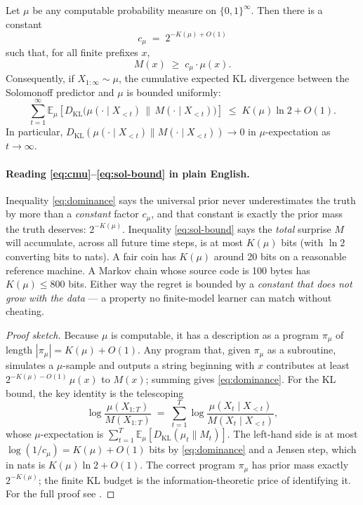 \begin{theorem}
\label{thm:solomonoff}
Let $\mu$ be any computable probability measure on $\{0,1\}^\infty$.
Then there is a constant
\begin{equation}
  c_\mu \;=\; 2^{-K(\mu) + O(1)}
  \label{eq:cmu}
\end{equation}
such that, for all finite prefixes $x$,
\begin{equation}
  M(x) \;\ge\; c_\mu \cdot \mu(x).
  \label{eq:dominance}
\end{equation}
Consequently, if $X_{1:\infty} \sim \mu$, the cumulative expected
KL divergence between the Solomonoff predictor and $\mu$ is bounded
uniformly:
\begin{equation}
  \sum_{t=1}^{\infty}
    \mathbb{E}_{\mu}\!\left[
      D_{\mathrm{KL}}\!\bigl(\mu(\cdot \mid X_{<t}) \,\|\, M(\cdot \mid X_{<t})\bigr)
    \right]
  \;\le\; K(\mu)\ln 2 + O(1).
  \label{eq:sol-bound}
\end{equation}
In particular,
$D_{\mathrm{KL}}(\mu(\cdot \mid X_{<t}) \| M(\cdot \mid X_{<t})) \to 0$
in $\mu$-expectation as $t \to \infty$.
\end{theorem}

\paragraph{Reading \eqref{eq:cmu}--\eqref{eq:sol-bound} in plain
English.}  Inequality \eqref{eq:dominance} says the universal prior
never underestimates the truth by more than a \emph{constant} factor
$c_\mu$, and that constant is exactly the prior mass the truth
deserves: $2^{-K(\mu)}$.  Inequality \eqref{eq:sol-bound} says the
\emph{total} surprise $M$ will accumulate, across all future time
steps, is at most $K(\mu)$ bits (with $\ln 2$ converting bits to
nats).  A fair coin has $K(\mu)$ around 20 bits on a reasonable
reference machine.  A Markov chain whose source code is 100 bytes
has $K(\mu) \le 800$ bits.  Either way the regret is bounded by a
\emph{constant that does not grow with the data} --- a property no
finite-model learner can match without cheating.

\begin{proof}[Proof sketch]
Because $\mu$ is computable, it has a description as a program
$\pi_\mu$ of length $|\pi_\mu| = K(\mu) + O(1)$.  Any program that,
given $\pi_\mu$ as a subroutine, simulates a $\mu$-sample and outputs
a string beginning with $x$ contributes at least
$2^{-K(\mu)-O(1)}\,\mu(x)$ to $M(x)$; summing gives
\eqref{eq:dominance}.  For the KL bound, the key identity is the
telescoping
\[
  \log \frac{\mu(X_{1:T})}{M(X_{1:T})}
  \;=\; \sum_{t=1}^{T}
    \log \frac{\mu(X_t \mid X_{<t})}{M(X_t \mid X_{<t})},
\]
whose $\mu$-expectation is
$\sum_{t=1}^T \mathbb{E}_\mu [D_{\mathrm{KL}}(\mu_t \| M_t)]$.  The
left-hand side is at most $\log(1/c_\mu) = K(\mu) + O(1)$ bits by
\eqref{eq:dominance} and a Jensen step, which in nats is
$K(\mu)\ln 2 + O(1)$.  The correct program $\pi_\mu$ has prior mass
exactly $2^{-K(\mu)}$; the finite KL budget is the
information-theoretic price of identifying it.  For the full proof
see \citet[Ch.~5]{livitanyi2019}.
\end{proof}

